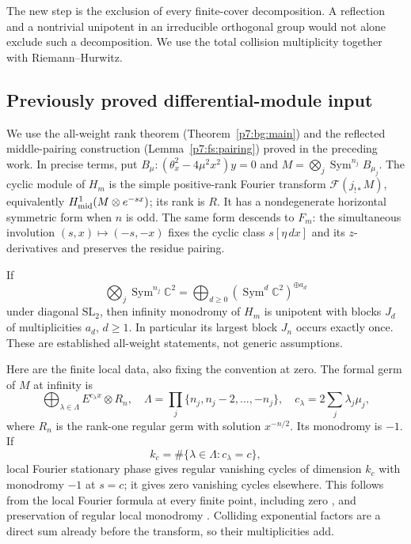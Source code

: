 \documentclass[11pt,a4paper]{article}
\theoremstyle{definition}
\theoremstyle{remark}
\numberwithin{equation}{section}
\begin{document}
The new step is the exclusion of every finite-cover decomposition.
A reflection and a nontrivial unipotent in an irreducible orthogonal
group would not alone exclude such a decomposition. We use the
total collision multiplicity together with Riemann--Hurwitz.

\subsection{Previously proved differential-module input}

We use the all-weight rank theorem (Theorem~\ref{p7:bg:main}) and the
reflected middle-pairing construction (Lemma~\ref{p7:fs:pairing})
proved in the preceding work. In precise terms, put
$B_\mu:(\theta_x^2-4\mu^2x^2)y=0$ and
$M=\bigotimes_j\operatorname{Sym}^{n_j}B_{\mu_j}$.
The cyclic module of $H_m$ is the simple positive-rank Fourier
transform $\mathcal F(j_{!*}M)$, equivalently
$H^1_{\rm mid}(M\otimes e^{-sx})$; its rank is $R$. It has a
nondegenerate horizontal symmetric form when $n$ is odd.
The same form descends to $F_m$: the simultaneous involution
$(s,x)\mapsto(-s,-x)$ fixes the cyclic class $s[\eta\,dx]$ and
its $z$-derivatives and preserves the residue pairing.

If
\[
 \bigotimes_j\operatorname{Sym}^{n_j}\mathbb C^2
   =\bigoplus_{d\ge0}(\operatorname{Sym}^d\mathbb C^2)^{\oplus a_d}
\]
under diagonal $\mathrm{SL}_2$, then infinity monodromy of $H_m$
is unipotent with blocks $J_d$ of multiplicities $a_d$, $d\ge1$.
In particular its largest block $J_n$ occurs exactly once.
These are established all-weight statements, not generic assumptions.

Here are the finite local data, also fixing the convention at zero.
The formal germ of $M$ at infinity is
\[
 \bigoplus_{\lambda\in\Lambda}E^{c_\lambda x}\otimes R_n,
 \quad \Lambda=\prod_j\{n_j,n_j-2,\ldots,-n_j\},
 \quad c_\lambda=2\sum_j\lambda_j\mu_j,
\]
where $R_n$ is the rank-one regular germ with solution $x^{-n/2}$.
Its monodromy is $-1$. If
\[
 k_c=\#\{\lambda\in\Lambda:c_\lambda=c\},
\]
local Fourier stationary phase gives regular vanishing cycles of
dimension $k_c$ with monodromy $-1$ at $s=c$; it gives zero
vanishing cycles elsewhere. This follows from the local Fourier
formula at every finite point, including zero
\cite[Corollary 2.3(1), \S3.3]{p8:LJR_Arinkin}, and preservation of
regular local monodromy \cite[Remarks 5.2, 5.3(4), 5.7]{p5:BG_Sabbah2008}.
Colliding exponential factors are a direct sum already before the
transform, so their multiplicities add.
\end{document}
